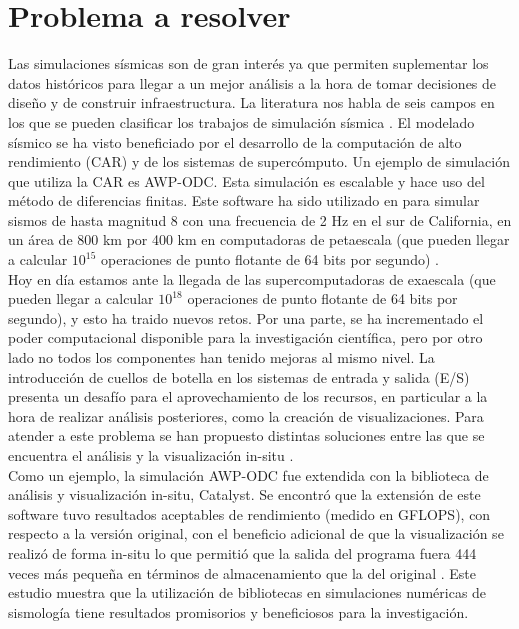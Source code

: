 \documentclass{article}
\begin{document}
\section{Problema a resolver}
Las simulaciones sísmicas son de gran interés ya que permiten suplementar los datos históricos para llegar a un mejor análisis a la hora de tomar decisiones de diseño y de construir infraestructura. La literatura nos habla de seis campos en los que se pueden clasificar los trabajos de simulación sísmica \cite{poursartip_large-scale_2020}. El modelado sísmico se ha visto beneficiado por el desarrollo de la computación de alto rendimiento (CAR) y de los sistemas de supercómputo. Un ejemplo de simulación que utiliza la CAR es AWP-ODC. Esta simulación es escalable y hace uso del método de diferencias finitas. Este software ha sido utilizado en para simular sismos de hasta magnitud 8 con una frecuencia de 2 Hz en el sur de California, en un área de 800 km por 400 km en computadoras de petaescala (que pueden llegar a calcular $10^{15}$ operaciones de punto flotante de 64 bits por segundo) \cite{Cui2010}.\\
Hoy en día estamos ante la llegada de las supercomputadoras de exaescala (que pueden llegar a calcular $10^{18}$ operaciones de punto flotante de 64 bits por segundo), y esto ha traido nuevos retos. Por una parte, se ha incrementado el poder computacional disponible para la investigación científica, pero por otro lado no todos los componentes han tenido mejoras al mismo nivel. La introducción de cuellos de botella en los sistemas de entrada y salida (E/S) presenta un desafío para el aprovechamiento de los recursos, en particular a la hora de realizar análisis posteriores, como la creación de visualizaciones. Para atender a este problema se han propuesto distintas soluciones entre las que se encuentra el análisis y la visualización in-situ \cite{akira_kageyama_approach_2014}.\\
Como un ejemplo, la simulación AWP-ODC fue extendida con la biblioteca de análisis y visualización in-situ, Catalyst. Se encontró que la extensión de este software tuvo resultados aceptables de rendimiento (medido en GFLOPS), con respecto a la versión original, con el beneficio adicional de que la visualización se realizó de forma in-situ lo que permitió que la salida del programa fuera 444 veces más pequeña en términos de almacenamiento que la del original \cite{mu_-situ_2019}. Este estudio muestra que la utilización de bibliotecas en simulaciones numéricas de sismología tiene resultados promisorios y beneficiosos para la investigación.\\
\end{document}
